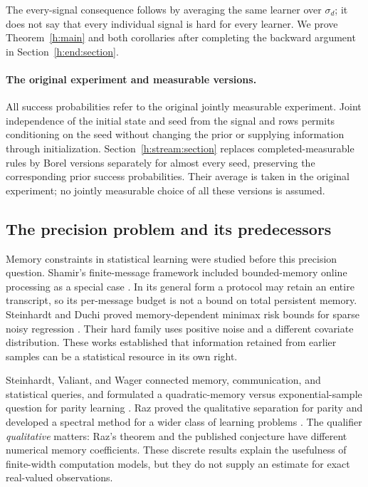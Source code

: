 The every-signal consequence follows by averaging the same learner
over \(\sigma_d\); it does not say that every individual signal is hard
for every learner. We prove Theorem~\ref{h:main} and both corollaries
after completing the backward argument in Section~\ref{h:end:section}.

\paragraph{The original experiment and measurable versions.}
All success probabilities refer to the original jointly measurable
experiment. Joint independence of the initial state and seed from the
signal and rows permits conditioning on the seed without changing the
prior or supplying information through initialization.
Section~\ref{h:stream:section} replaces completed-measurable rules
by Borel versions separately for almost every seed, preserving the
corresponding prior success probabilities. Their average is taken
in the original experiment; no jointly measurable choice of all these
versions is assumed.

\subsection{The precision problem and its predecessors}

Memory constraints in statistical learning were studied before this
precision question. Shamir's finite-message framework included
bounded-memory online processing as a special case
\cite[Section~2, Definition~1]{Shamir2014}. In its general form a
protocol may retain an entire transcript, so its per-message budget is
not a bound on total persistent memory. Steinhardt and Duchi proved
memory-dependent minimax risk bounds for sparse noisy regression
\cite[Section~1.1, Equation~(2)]{SteinhardtDuchi2015}. Their hard
family uses positive noise and a different covariate distribution.
These works established that information retained from earlier samples
can be a statistical resource in its own right.

Steinhardt, Valiant, and Wager connected memory, communication, and
statistical queries, and formulated a quadratic-memory versus
exponential-sample question for parity learning
\cite[Section~1.1, Conjecture~1]{SVW2016}. Raz proved the qualitative
separation for parity \cite[Theorem~1 and Remark~1.1]{Raz2016} and
developed a spectral method for a wider class of learning problems
\cite{Raz2017}. The qualifier \emph{qualitative} matters: Raz's
theorem and the published conjecture have different numerical
memory coefficients. These discrete results explain the usefulness of
finite-width computation models, but they do not supply an estimate
for exact real-valued observations.

